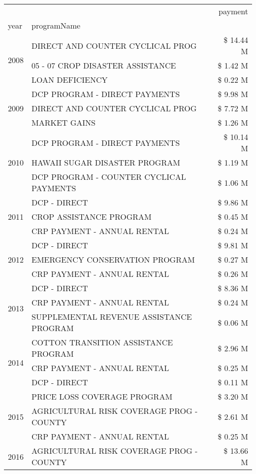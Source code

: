 \begin{tabular}{llr}
\toprule
 &  & payment \\
year & programName &  \\
\midrule
\multirow[t]{3}{*}{2008} & DIRECT AND COUNTER CYCLICAL PROG & \$ 14.44 M \\
 & 05 - 07 CROP DISASTER ASSISTANCE & \$ 1.42 M \\
 & LOAN DEFICIENCY & \$ 0.22 M \\
\cline{1-3}
\multirow[t]{3}{*}{2009} & DCP PROGRAM - DIRECT PAYMENTS & \$ 9.98 M \\
 & DIRECT AND COUNTER CYCLICAL PROG & \$ 7.72 M \\
 & MARKET GAINS & \$ 1.26 M \\
\cline{1-3}
\multirow[t]{3}{*}{2010} & DCP PROGRAM - DIRECT PAYMENTS & \$ 10.14 M \\
 & HAWAII SUGAR DISASTER PROGRAM & \$ 1.19 M \\
 & DCP PROGRAM - COUNTER CYCLICAL PAYMENTS & \$ 1.06 M \\
\cline{1-3}
\multirow[t]{3}{*}{2011} & DCP - DIRECT & \$ 9.86 M \\
 & CROP ASSISTANCE PROGRAM & \$ 0.45 M \\
 & CRP PAYMENT - ANNUAL RENTAL & \$ 0.24 M \\
\cline{1-3}
\multirow[t]{3}{*}{2012} & DCP - DIRECT & \$ 9.81 M \\
 & EMERGENCY CONSERVATION PROGRAM & \$ 0.27 M \\
 & CRP PAYMENT - ANNUAL RENTAL & \$ 0.26 M \\
\cline{1-3}
\multirow[t]{3}{*}{2013} & DCP - DIRECT & \$ 8.36 M \\
 & CRP PAYMENT - ANNUAL RENTAL & \$ 0.24 M \\
 & SUPPLEMENTAL REVENUE ASSISTANCE PROGRAM & \$ 0.06 M \\
\cline{1-3}
\multirow[t]{3}{*}{2014} & COTTON TRANSITION ASSISTANCE PROGRAM & \$ 2.96 M \\
 & CRP PAYMENT - ANNUAL RENTAL & \$ 0.25 M \\
 & DCP - DIRECT & \$ 0.11 M \\
\cline{1-3}
\multirow[t]{3}{*}{2015} & PRICE LOSS COVERAGE PROGRAM & \$ 3.20 M \\
 & AGRICULTURAL RISK COVERAGE PROG - COUNTY & \$ 2.61 M \\
 & CRP PAYMENT - ANNUAL RENTAL & \$ 0.25 M \\
\cline{1-3}
\multirow[t]{3}{*}{2016} & AGRICULTURAL RISK COVERAGE PROG - COUNTY & \$ 13.66 M \\

\end{tabular}
